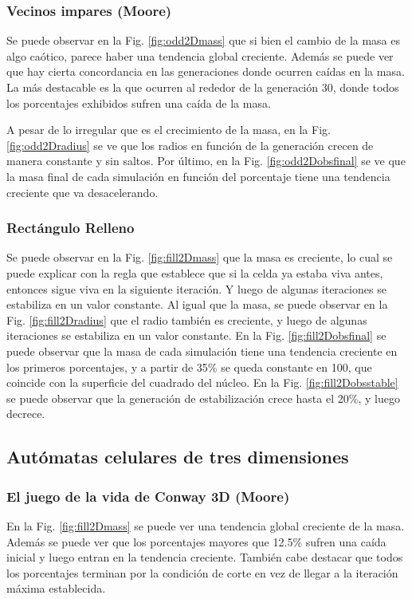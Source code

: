 \subsubsection{Vecinos impares (Moore)}
Se puede observar en la Fig. \ref{fig:odd2Dmass} que si bien el cambio de la masa es algo caótico, parece haber una tendencia global creciente.
Además se puede ver que hay cierta concordancia en las generaciones donde ocurren caídas en la masa. La más destacable es la que ocurren al rededor de la generación 30, donde todos los porcentajes exhibidos sufren una caída de la masa.

A pesar de lo irregular que es el crecimiento de la masa, en la Fig. \ref{fig:odd2Dradius} se ve que los radios en función de la generación crecen de manera constante y sin saltos.
Por último, en la Fig. \ref{fig:odd2Dobsfinal} se ve que la masa final de cada simulación en función del porcentaje tiene una tendencia creciente que va desacelerando.

\subsubsection{Rectángulo Relleno}
Se puede observar en la Fig. \ref{fig:fill2Dmass} que la masa es creciente, lo cual se puede explicar con la regla que establece que si la celda ya estaba viva antes, entonces sigue viva en la siguiente iteración.
Y luego de algunas iteraciones se estabiliza en un valor constante.
Al igual que la masa, se puede observar en la Fig. \ref{fig:fill2Dradius} que el radio también es creciente, y luego de algunas iteraciones se estabiliza en un valor constante.
En la Fig. \ref{fig:fill2Dobsfinal} se puede observar que la masa de cada simulación tiene una tendencia creciente en los primeros porcentajes, y a partir de 35\% se queda constante en 100, que coincide con la superficie del cuadrado del núcleo.
En la Fig. \ref{fig:fill2Dobsstable} se puede observar que la generación de estabilización crece hasta el 20\%, y luego decrece.


\subsection{Autómatas celulares de tres dimensiones}
\label{subsec:results3d}

\subsubsection{El juego de la vida de Conway 3D (Moore)}
En la Fig. \ref{fig:fill2Dmass} se puede ver una tendencia global creciente de la masa. Además se puede ver que los porcentajes mayores que 12.5\% sufren una caída inicial y luego entran en la tendencia creciente.
También cabe destacar que todos los porcentajes terminan por la condición de corte en vez de llegar a la iteración máxima establecida.

